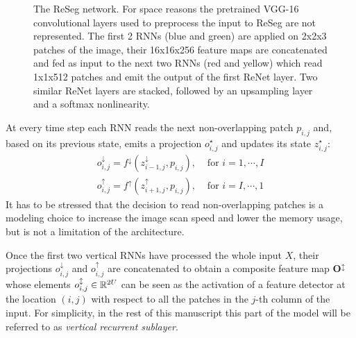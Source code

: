 \begin{figure}[t]
    \advance{}\textwidth
    \centering
    \caption{The ReSeg network. For space reasons the pretrained VGG-16
        convolutional layers used to preprocess the input to ReSeg are
        not represented. The first 2 RNNs (blue and green) are applied on
        2x2x3 patches of the image, their 16x16x256 feature maps are
        concatenated and fed as input to the next two RNNs (red and yellow)
        which read 1x1x512 patches and emit the output of the first ReNet
        layer. Two similar ReNet layers are stacked, followed by an upsampling
        layer and a softmax nonlinearity.}
    \label{fig:ReSeg}
\end{figure}

At every time step each RNN reads the next non-overlapping patch $p_{i,j}$ and,
based on its previous state, emits a projection $o_{i,j}^{\star}$ and updates
its state $z_{i,j}^{\star}$:
\begin{align}
    o^{\downarrow}_{i,j} = f^{\downarrow}(z^{\downarrow}_{i-1,j},p_{i,j}),
        &\text{ for }i=1,\cdots, I\\
    o^{\uparrow}_{i,j} = f^{\uparrow}(z^{\uparrow}_{i+1,j},p_{i,j}),
        &\text{ for }i=I,\cdots,1
\end{align}
It has to be stressed that the decision to read non-overlapping patches is a
modeling choice to increase the image scan speed and lower the memory usage,
but is not a limitation of the architecture.

Once the first two vertical RNNs have processed the whole input $X$, their
projections $o^{\downarrow}_{i,j}$ and $o^{\uparrow}_{i,j}$ are concatenated to
obtain a composite feature map $\mathbf{O^{\updownarrow}}$ whose elements
$o^{\updownarrow}_{i,j} \in \mathbb{R}^{2U}$ can be seen as the activation of a
feature detector at the location $(i,j)$ with respect to all the patches in the
$j$-th column of the input. For simplicity, in the rest of this manuscript
this part of the model will be referred to as \emph{vertical recurrent
sublayer}.


